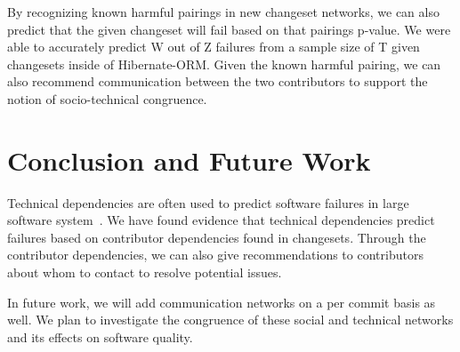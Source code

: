 \documentclass[conference]{IEEEtran}
\begin{document}
By recognizing known harmful pairings in new changeset networks, we can also predict that the
given changeset will fail based on that pairings p-value. We were able to accurately predict 
W out of Z failures from a sample size of T given changesets inside of Hibernate-ORM. Given 
the known harmful pairing, we can also recommend communication between the two 
contributors to support the notion of socio-technical congruence.


\section{Conclusion and Future Work}
Technical dependencies are often used to predict software failures
in large software system~\cite{Pinzger:2008:DNP, Zimmermann:2008:PDU}. 
We have found evidence that technical dependencies predict failures based on contributor
dependencies found in changesets. Through the contributor dependencies,
we can also give recommendations to contributors about whom to contact to
resolve potential issues.

In future work, we will add communication networks on a per commit basis as well. We plan
to investigate the congruence of these social and technical networks and its effects on 
software quality.







\end{document}

